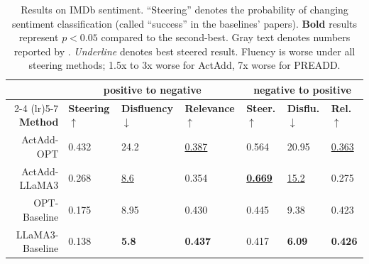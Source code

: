 
\bgroup
\def\arraystretch{1}
\begin{table}[h!]
\centering
\caption{Results on IMDb sentiment. ``Steering'' denotes the probability of changing sentiment classification (called ``success'' in the baselines' papers). \textbf{Bold} results represent $p<0.05$ compared to the second-best. {\color{airforceblue}Gray text} denotes numbers reported by \cite{pei2023preadd}. \textit{Underline} denotes best steered result. Fluency is worse under all steering methods; 1.5x to 3x worse for ActAdd, 7x worse for PREADD. }
\vspace{1mm}


\begin{tabular}{rllllll}
\toprule
 & \multicolumn{3}{c}{\textbf{positive to negative}} & \multicolumn{3}{c}{\textbf{negative to positive}}    \\
\cmidrule(lr){2-4} \cmidrule(lr){5-7}
 \textbf{Method} & \textbf{Steering $\uparrow$} & \textbf{Disfluency $\downarrow$} & \textbf{Relevance $\uparrow$} & \textbf{Steer. $\uparrow$} & \textbf{Disflu. $\downarrow$} & \textbf{Rel. $\uparrow$} 
\\\midrule
ActAdd-OPT & 0.432 & 24.2 & \underline{0.387} & 0.564 & 20.95 & \underline{0.363} \\ %
ActAdd-LLaMA3 & 0.268 & \underline{8.6} & 0.354 & \underline{\textbf{0.669}} & \underline{15.2} & 0.275\\ %
OPT-Baseline & 0.175 & 8.95 & 0.430 & 0.445 & 9.38 & 0.423 \\ %
 LLaMA3-Baseline & 0.138 & \textbf{5.8} & \textbf{0.437} & 0.417 & \textbf{6.09} & \textbf{0.426} \\ %

\end{tabular}
\end{table}
